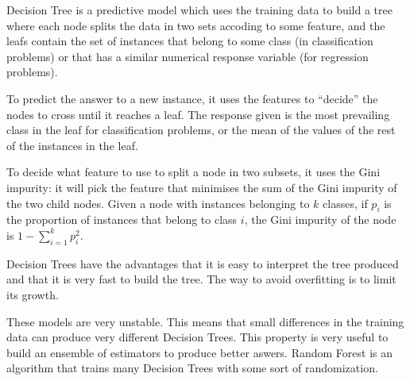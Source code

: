   \begin{pre-delivery}
    Decision Tree\cite{breiman2017classification}\cite{lewis2000introduction}
    is a predictive model which uses
    the training data to build
    a tree where each node splits the data in two sets accoding to some
    feature, and the leafs contain the set of instances that belong to some class
    (in classification problems) or that has a similar numerical response variable
    (for regression problems).

    To predict the answer to a new instance, it uses the features to ``decide''
    the nodes to cross until it reaches a leaf. The response given is the
    most prevailing class in the leaf for classification problems, or the mean
    of the values of the rest of the instances in the leaf.

    To decide what feature to use to split a node in two subsets, it uses
    the Gini impurity: it will pick the feature that minimises the sum of
    the Gini impurity of the two child nodes. Given a node with instances
    belonging to $k$ classes, if $p_i$ is the proportion of instances that
    belong to class $i$, the Gini impurity of the node is
    $1 - \sum_{i = 1}^k p_i^2$.

    Decision Trees have the advantages that it is easy to interpret the
    tree produced and that it is very fast to build the tree. The way to avoid
    overfitting is to limit its growth.

    These models are very unstable. This means that small differences in the
    training data can produce very different Decision Trees. This property
    is very useful to build an ensemble of estimators to produce better aswers.
    Random Forest is an algorithm that trains many Decision Trees with some sort
    of randomization.
  \end{pre-delivery}
